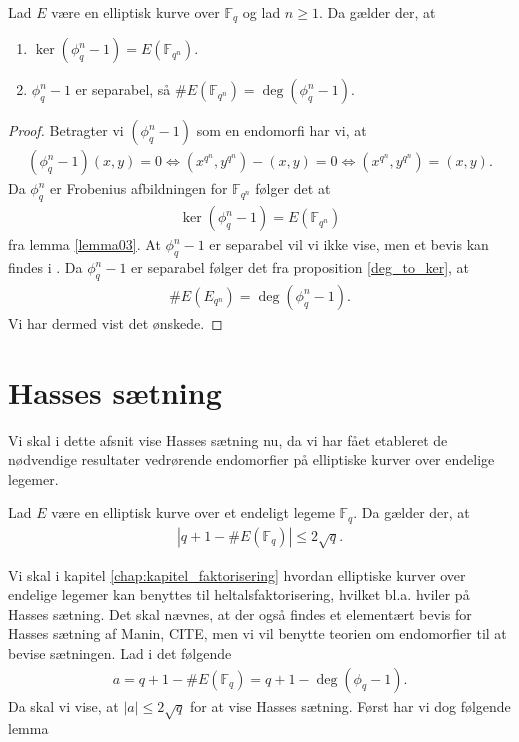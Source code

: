 \begin{proposition}
\label{prop_imp}
Lad $E$ være en elliptisk kurve over $\mathbb{F}_q$ og lad $n \geq 1$. Da gælder der,
at 
\begin{enumerate}
	\item $\ker (\phi_{q}^n - 1) = E(\mathbb{F}_{q^n})$. \label{test}
	\item $\phi_{q}^{n}-1$ er separabel, så $\#E(\mathbb{F}_{q^n})=\deg (\phi_{q}^{n}-1)$. 
\end{enumerate}
\end{proposition}
\begin{proof}
Betragter vi $(\phi_{q}^{n} - 1)$ som en endomorfi har vi, at
\begin{align*}
	(\phi_{q}^{n} - 1)(x, y) = 0 \Leftrightarrow (x^{q^n}, y^{q^n}) - (x, y) = 0 
	\Leftrightarrow (x^{q^n}, y^{q^n}) = (x, y).
\end{align*}
Da $\phi_{q}^{n}$ er Frobenius afbildningen for $\mathbb{F}_{q^n}$ følger det at 
\begin{align*}
	\ker (\phi_{q}^{n} - 1) = E(\mathbb{F}_{q^n})
\end{align*} 
fra lemma \ref{lemma03}. At $\phi_{q}^{n} -1$ er separabel vil vi ikke vise, men et bevis kan findes
i \cite[s.~58]{Washington}. Da $\phi_{q}^{n} - 1$ er separabel følger det fra proposition \ref{deg_to_ker}, at
\begin{align*}
	\#E(E_{q^n})=\deg(\phi_{q}^{n} -1).
\end{align*} 
Vi har dermed vist det ønskede.
\end{proof}

\section{Hasses sætning}
Vi skal i dette afsnit vise Hasses sætning nu, da vi har fået etableret de nødvendige resultater vedrørende endomorfier på elliptiske kurver over endelige legemer.
\begin{thm}[Hasse]
\label{hasse}
Lad $E$ være en elliptisk kurve over et endeligt legeme $\mathbb{F}_q$. Da gælder der, at 
\begin{align*}
	|q + 1 - \#E(\mathbb{F}_q)| \leq 2 \sqrt{q}.
\end{align*}
\end{thm}
Vi skal i kapitel \ref{chap:kapitel_faktorisering} hvordan elliptiske kurver over endelige legemer kan benyttes til heltalsfaktorisering, hvilket bl.a. hviler på Hasses sætning. Det skal nævnes, at der også findes et elementært bevis for Hasses sætning af Manin, CITE, men vi vil benytte teorien om endomorfier til at bevise sætningen.
Lad i det følgende 
\begin{align}
	\label{hasse_as}
	a = q + 1 - \#E(\mathbb{F}_q) = q + 1 - \deg(\phi_q - 1).
\end{align}
Da skal vi vise, at $|a| \leq 2 \sqrt{q}$ for at vise Hasses sætning. Først har vi dog følgende lemma

